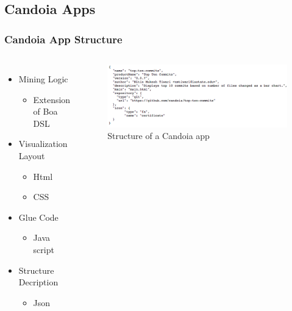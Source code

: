     \subsection{Candoia Apps}
        \begin{frame}
        \frametitle{Candoia App Structure}
        \begin{columns}
                \begin{itemize}
                  \item Mining Logic
                    \begin{itemize}
                        \item Extension of Boa DSL
                    \end{itemize}
                  \item Visualization Layout
                    \begin{itemize}
                        \item Html
                        \item CSS
                    \end{itemize}
                  \item Glue Code
                    \begin{itemize}
                        \item Java script
                    \end{itemize}
                  \item Structure Decription
                    \begin{itemize}
                        \item Json %
                    \end{itemize}
                \end{itemize}

                \begin{figure}
                    \centering
                    \includegraphics[scale=0.28]{figures/structure.png}
                    \caption{Structure of a Candoia app}
                \end{figure}
        \end{columns}
        \end{frame}

